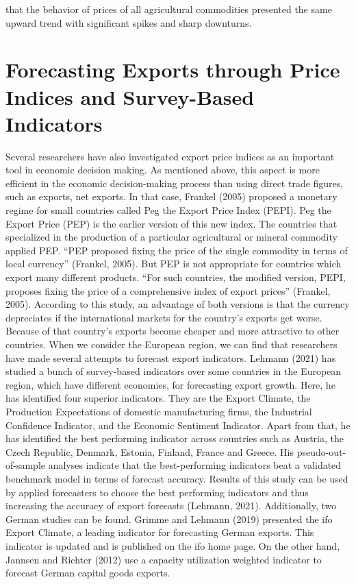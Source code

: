 \documentclass[12pt,a4paper]{report} %
\begin{document}
that the behavior of prices of all agricultural commodities presented the same upward trend with significant spikes and sharp downturns. 
	
	\section{Forecasting Exports through Price Indices and Survey-Based Indicators}
	
	Several researchers have also investigated export price indices as an important tool in economic decision making. As mentioned above, this aspect is more efficient in the economic decision-making process than using direct trade figures, such as exports, net exports. In that case, Frankel (2005) proposed a monetary regime for small countries called Peg the Export Price Index (PEPI). Peg the Export Price (PEP) is the earlier version of this new index. The countries that specialized in the production of a particular agricultural or mineral commodity applied PEP. ``PEP proposed fixing the price of the single commodity in terms of local currency'' (Frankel, 2005). But PEP is not appropriate for countries which export many different products. ``For such countries, the modified version, PEPI, proposes fixing the price of a comprehensive index of export prices'' (Frankel, 2005). According to this study, an advantage of both versions is that the currency depreciates if the international markets for the country’s exports get worse. Because of that country’s exports become cheaper and more attractive to other countries. When we consider the European region, we can find that researchers have made several attempts to forecast export indicators. Lehmann (2021) has studied a bunch of survey-based indicators over some countries in the European region, which have different economies, for forecasting export growth. Here, he has identified four superior indicators. They are the Export Climate, the Production Expectations of domestic manufacturing firms, the Industrial Confidence Indicator, and the Economic Sentiment Indicator. Apart from that, he has identified the best performing indicator across countries such as Austria, the Czech Republic, Denmark, Estonia, Finland, France and Greece. His pseudo-out-of-sample analyses indicate that the best-performing indicators beat a validated benchmark model in terms of forecast accuracy. Results of this study can be used by applied forecasters to choose the best performing indicators and thus increasing the accuracy of export forecasts (Lehmann, 2021). Additionally, two German studies can be found. Grimme and Lehmann (2019) presented the ifo Export Climate, a leading indicator for forecasting German exports. This indicator is updated and is published on the ifo home page. On the other hand, Jannsen and Richter (2012) use a capacity utilization weighted indicator to forecast German capital goods exports. 
	
\end{document}
